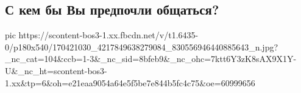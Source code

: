  
 
 
 
 

\subsection{С кем бы Вы предпочли общаться?}

\ifcmt
  pic https://scontent-bos3-1.xx.fbcdn.net/v/t1.6435-0/p180x540/170421030_4217849638279084_830556946440885643_n.jpg?_nc_cat=104&ccb=1-3&_nc_sid=8bfeb9&_nc_ohc=7ktt6Y3zK8sAX9X1Y-U&_nc_ht=scontent-bos3-1.xx&tp=6&oh=e21eaa9054a64e5f5be7e844b5fc4c75&oe=60999656
\fi

